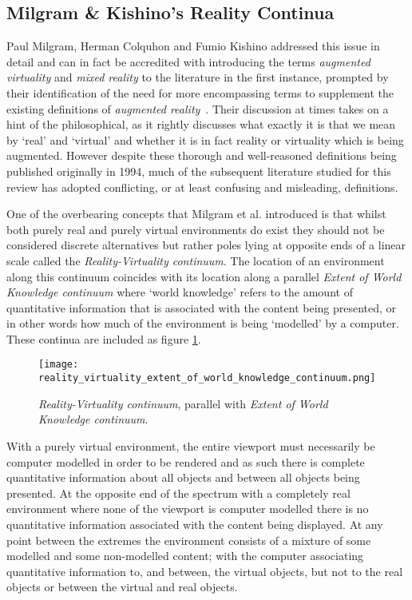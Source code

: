 
\subsection{Milgram \& Kishino's Reality Continua}
Paul Milgram, Herman Colquhon and Fumio Kishino addressed this issue in detail and can in fact be accredited with introducing the terms \textit{augmented virtuality} and \textit{mixed reality} to the literature in the first instance, prompted by their identification of the need for more encompassing terms to supplement the existing definitions of \textit{augmented reality}~\cite{Milgram1994, Milgram1999}. Their discussion at times takes on a hint of the philosophical, as it rightly discusses what exactly it is that we mean by `real' and `virtual' and whether it is in fact reality or virtuality which is being augmented. However despite these thorough and well-reasoned definitions being published originally in 1994, much of the subsequent literature studied for this review has adopted conflicting, or at least confusing and misleading, definitions.

One of the overbearing concepts that Milgram et al. introduced is that whilst both purely real and purely virtual environments do exist they should not be considered discrete alternatives but rather poles lying at opposite ends of a linear scale called the \textit{Reality-Virtuality continuum}. The location of an environment along this continuum coincides with its location along a parallel \textit{Extent of World Knowledge continuum} where `world knowledge' refers to the amount of quantitative information that is associated with the content being presented, or in other words how much of the environment is being `modelled' by a computer. These continua are included as figure \ref{reality_virtuality_extent_of_world_knowledge_continuum}.

\begin{figure}[h]
\centering
\texttt{[image: reality\_virtuality\_extent\_of\_world\_knowledge\_continuum.png]}
\caption{\textit{Reality-Virtuality continuum}, parallel with \textit{Extent of World Knowledge continuum}.}
\label{reality_virtuality_extent_of_world_knowledge_continuum}
\end{figure}

With a purely virtual environment, the entire viewport must necessarily be computer modelled in order to be rendered and as such there is complete quantitative information about all objects and between all objects being presented. At the opposite end of the spectrum with a completely real environment where none of the viewport is computer modelled there is no quantitative information associated with the content being displayed. At any point between the extremes the environment consists of a mixture of some modelled and some non-modelled content; with the computer associating quantitative information to, and between, the virtual objects, but not to the real objects or between the virtual and real objects.

